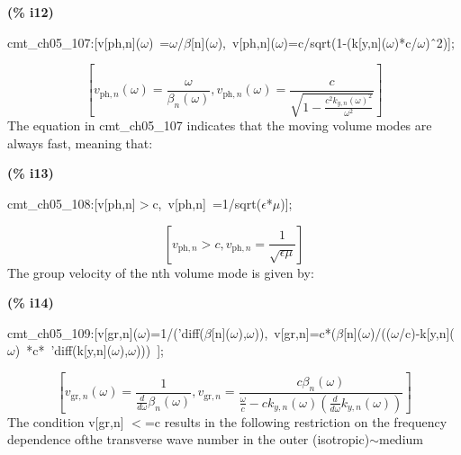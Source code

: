 \documentclass[fleqn]{article}
\begin{document}
\noindent
\begin{minipage}[t]{4.000000em}\color{red}\bfseries
(\% i12)	
\end{minipage}
\begin{minipage}[t]{\textwidth}\color{blue}
cmt\_ch05\_107:[v[ph,n](\ensuremath{\omega})\ =\ensuremath{\omega}/\ensuremath{\beta}[n](\ensuremath{\omega}),\ v[ph,n](\ensuremath{\omega})=c/sqrt(1-(k[y,n](\ensuremath{\omega})*c/\ensuremath{\omega})\^\ 2)];
\end{minipage}
\[\displaystyle \tag{\% o12} 
\left[ {v_{\ensuremath{\mathrm{ph}},n}}\left( \omega \right) =\frac{\omega }{{{\beta }_n}\left( \omega \right) }\operatorname{,}{v_{\ensuremath{\mathrm{ph}},n}}\left( \omega \right) =\frac{c}{\sqrt{1-\frac{{{c}^{2}} {{{k_{y,n}}\left( \omega \right) }^{2}}}{{{\omega }^{2}}}}}\right] \mbox{}
\]
The equation in cmt\_ch05\_107 indicates that the moving volume modes are always fast, meaning that:


\noindent
\begin{minipage}[t]{4.000000em}\color{red}\bfseries
(\% i13)	
\end{minipage}
\begin{minipage}[t]{\textwidth}\color{blue}
cmt\_ch05\_108:[v[ph,n]\ensuremath{>}c,\ v[ph,n]\ =1/sqrt(\ensuremath{\epsilon}*\ensuremath{\mu})];
\end{minipage}
\[\displaystyle \tag{\% o13} 
\left[ {v_{\ensuremath{\mathrm{ph}},n}}\operatorname{>  }c\operatorname{,}{v_{\ensuremath{\mathrm{ph}},n}}=\frac{1}{\sqrt{\epsilon  \mu }}\right] \mbox{}
\]
The group velocity of the nth volume mode is given by:


\noindent
\begin{minipage}[t]{4.000000em}\color{red}\bfseries
(\% i14)	
\end{minipage}
\begin{minipage}[t]{\textwidth}\color{blue}
cmt\_ch05\_109:[v[gr,n](\ensuremath{\omega})=1/('diff(\ensuremath{\beta}[n](\ensuremath{\omega}),\ensuremath{\omega})),\ v[gr,n]=c*(\ensuremath{\beta}[n](\ensuremath{\omega})/((\ensuremath{\omega}/c)-k[y,n](\ensuremath{\omega})\ *c*\ 'diff(k[y,n](\ensuremath{\omega}),\ensuremath{\omega})))\ ];
\end{minipage}
\[\displaystyle \tag{\% o14} 
\left[ {v_{\ensuremath{\mathrm{gr}},n}}\left( \omega \right) =\frac{1}{\frac{d}{d \omega } {{\beta }_n}\left( \omega \right) }\operatorname{,}{v_{\ensuremath{\mathrm{gr}},n}}=\frac{c {{\beta }_n}\left( \omega \right) }{\frac{\omega }{c}-c {k_{y,n}}\left( \omega \right)  \left( \frac{d}{d \omega } {k_{y,n}}\left( \omega \right) \right) }\right] \mbox{}
\]
The condition v[gr,n] \ensuremath{<}=c results in the following restriction on the frequency dependence ofthe transverse wave number in the outer (isotropic)\ensuremath{\sim }medium
\end{document}

